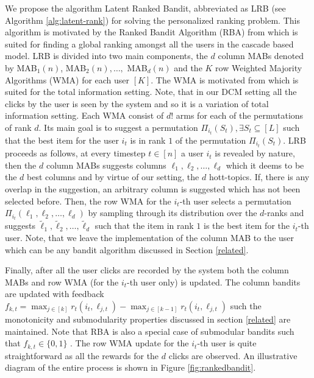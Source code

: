 We propose the algorithm Latent Ranked Bandit, abbreviated as LRB (see Algorithm \ref{alg:latent-rank}) for solving the personalized ranking problem. This algorithm is motivated by the Ranked Bandit Algorithm (RBA) from \citet{radlinski2008learning} which is suited for finding a global ranking amongst all the users in the cascade based model. LRB is divided into two main components, the $d$ column MABs denoted by MAB$_1(n)$, MAB$_2(n), \dots,$ MAB$_d(n)$ and the $K$ row Weighted Majority Algorithms (WMA) for each user $[K]$. The WMA is motivated from \citet{littlestone1994weighted} which is suited for the total information setting. Note, that in our DCM setting all the clicks by the user is seen by the system and so it is a variation of total information setting. Each WMA consist of $d!$ arms for each of the permutations of rank $d$. Its main goal is to suggest a permutation $\Pi_{i_t}(S_t), \exists S_t \subseteq [L]$ such that the best item for the user $i_t$ is in rank $1$ of the permutation $\Pi_{i_t}(S_t)$.  LRB proceeds as follows, at every timestep $t\in[n]$ a user $i_t$ is revealed by nature, then the $d$ column MABs suggests columns ${\ell}_{1}, {\ell}_{2},\dots, {\ell}_{d}$ which it deems to be the $d$ best columns and by virtue of our setting, the $d$ hott-topics. If, there is any overlap in the suggestion, an arbitrary column is suggested which has not been selected before. Then, the row WMA for the $i_t$-th user selects a permutation $\Pi_{i_t}({\ell}_{1}, {\ell}_{2},\dots, {\ell}_{d})$ by sampling through its distribution over the $d$-ranks and suggests $\tilde{\ell}_{1}, \tilde{\ell}_{2},\dots, \tilde{\ell}_{d}$ such that the item in rank $1$ is the best item for the $i_t$-th user. Note, that we leave the implementation of the column MAB to the user which can be any bandit algorithm discussed in Section \ref{related}.

Finally, after all the user clicks are recorded by the system both the column MABs and row WMA (for the $i_t$-th user only) is updated. The column bandits are updated with feedback $f_{k,t} = \max_{j\in [k]} r_t(i_t, \ell_{j,t}) - \max_{j\in [k-1]} r_t(i_t,\ell_{j,t})$ such the monotonicity and submodularity properties discussed in section \ref{related} are maintained. Note that RBA is also a special case of submodular bandits such that $f_{k,t}\in\lbrace 0, 1\rbrace$ \citep{streeter2009online}. The row WMA update for the $i_t$-th user is quite straightforward as all the rewards for the $d$ clicks are observed. An illustrative diagram of the entire process is shown in Figure \ref{fig:rankedbandit}.



